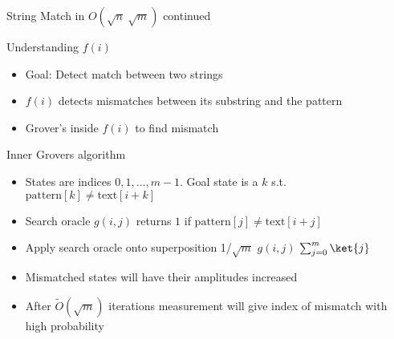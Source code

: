 \documentclass{beamer}
\begin{document}
\begin{frame}{String Match in \(O(\sqrt{n}\ \sqrt{m})\) continued}
  \begin{block}{Understanding \(f(i)\)}
    \begin{itemize}
      \item Goal: Detect match between two strings
      \item \(f(i)\) detects mismatches between its substring and the pattern
      \item Grover's inside \(f(i)\) to find mismatch


    \end{itemize}
  \end{block}
  \begin{block}{Inner Grovers algorithm}
    \begin{itemize}
      \item States are indices \(0,1,\dots,m-1\). Goal state is a \(k\) s.t. \(\text{pattern}[k] \neq \text{text}[i+k]\)
      \item Search oracle \(g(i,j)\) returns \(1\) if \(\text{pattern}[j] \neq \text{text}[i+j]\)
      \item Apply search oracle onto superposition 1/$\sqrt{m}$ \(g(i,j)\) $\sum_{j=0}^{m} \ket{j} $
      \item Mismatched states will have their amplitudes increased
      \item After \(\widetilde{O}(\sqrt{m})\) iterations measurement will give index of mismatch with high probability
    \end{itemize}
  \end{block}
\end{frame}
\end{document}
